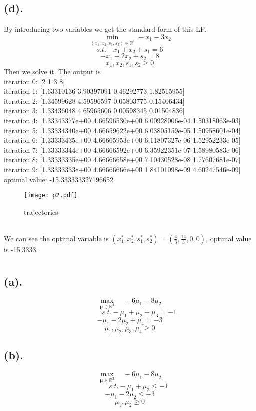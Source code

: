 \documentclass[12pt,letterpaper]{article}
\begin{document}
\subsection*{(d).}
By introducing two variables we get the standard form of this LP.\\
$$
\min_{(x_1,x_2,s_1,s_2)\in\mathbb{R}^4} -x_1-3x_2$$
$$s.t.\quad x_1+x_2+s_1=6$$
$$-x_1+2x_2+s_2=8$$
$$x_1,x_2,s_1,s_2 \geq0$$
Then we solve it. The output is \\
iteration 0: [2 1 3 8]\\
iteration 1: [1.63310136 3.90397091 0.46292773 1.82515955]\\
iteration 2: [1.34599628 4.59596597 0.05803775 0.15406434]\\
iteration 3: [1.33436048 4.65965606 0.00598345 0.01504836]\\
iteration 4: [1.33343377e+00 4.66596530e+00 6.00928006e-04 1.50318063e-03]\\
iteration 5: [1.33334340e+00 4.66659622e+00 6.03805159e-05 1.50958601e-04]\\
iteration 6: [1.33333435e+00 4.66665953e+00 6.11807327e-06 1.52952233e-05]\\
iteration 7: [1.33333344e+00 4.66666592e+00 6.35922351e-07 1.58980583e-06]\\
iteration 8: [1.33333335e+00 4.66666658e+00 7.10430528e-08 1.77607681e-07]\\
iteration 9: [1.33333333e+00 4.66666666e+00 1.84101098e-09 4.60247546e-09]\\
optimal value: -15.333333327196652
\begin{figure}[h]
\centering
\texttt{[image: p2.pdf]}
\caption{trajectories}
\label{trandgap1a}
\end{figure}
\\
We can see the optimal variable is $(x_1^*,x_2^*,s_1^*,s_2^*)=(\frac{4}{3},\frac{14}{3},0,0)$, optimal value is -15.3333.
\newpage
\section{}
\subsection*{(a).}
$$\max_{\boldsymbol{\mu}\in\mathbb{R}^4}\quad-6\mu_1-8\mu_2
$$
$\qquad\qquad\qquad\qquad\qquad\qquad\qquad s.t. -\mu_1+\mu_2+\mu_3=-1$
$$-\mu_1-2\mu_2+\mu_4=-3$$
$$\mu_1,\mu_2,\mu_3,\mu_4\geq0$$
\subsection*{(b).}
$$\max_{\boldsymbol{\mu}\in\mathbb{R}^2}\quad-6\mu_1-8\mu_2
$$
$\qquad\qquad\qquad\qquad\qquad\qquad\qquad\quad s.t. -\mu_1+\mu_2\leq-1$
$$-\mu_1-2\mu_2\leq-3$$
$$\mu_1,\mu_2\geq0$$
\end{document}
